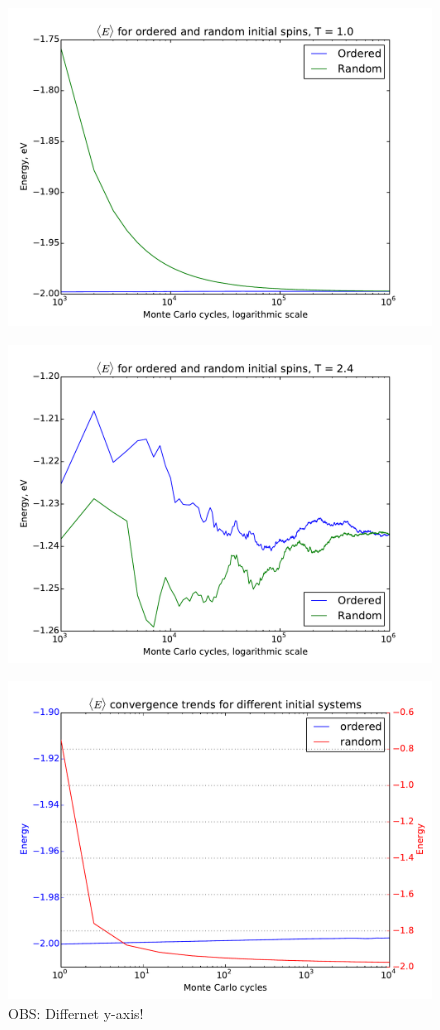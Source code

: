 \begin{figure}[H]
	\centering
	\includegraphics[width=0.7\linewidth]{../results/4c/ran_order_T1}
	\caption{}
	\label{fig:ranordert1}
\end{figure}
\begin{figure}[H]
	\centering
	\includegraphics[width=0.7\linewidth]{../results/4c/ran_order_T2}
	\caption{}
	\label{fig:ranordert2}
\end{figure}


\begin{figure}[H]
	\centering
	\includegraphics[width=0.7\linewidth]{../results/4c/ran_order_T1_start}
	\caption{OBS: Differnet y-axis! }
	\label{fig:ranorder_t1_start}
\end{figure}




